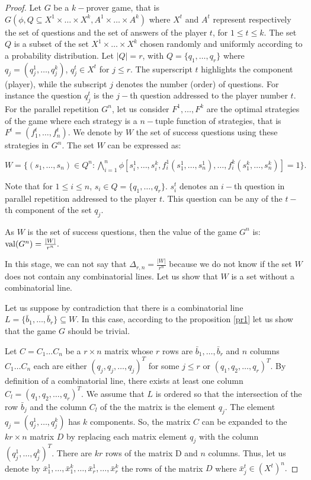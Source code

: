 \begin{proof}
Let $G$ be a $k-$prover game, that is $G(\phi, Q\subseteq X^1 \times \ldots \times X^k, A^1 \times \ldots \times A^k)$ where $X^t$ and $A^t$ represent respectively the set of questions and the set of answers of the player $t$, for $1\leq t \leq k.$ The set $Q$ is a subset of the set $X^1 \times \ldots \times X^k$ chosen randomly and uniformly according to a probability distribution. Let $|Q|=r$, with $Q=\{q_1, \ldots, q_r\}$ where $q_j=(q_j^1,\ldots, q_j^k)$, $q_j^t \in X^t$ for $j\leq r.$ The superscript  $t$ highlights the component (player), while the subscript $j$ denotes the number (order) of questions. For instance the question $q_j^t$ is the $j-$th question addressed to the player number $t.$  For the parallel repetition $G^n$, let us consider $F^1, \ldots, F^k$ are the optimal strategies of the game where each strategy is a $n-$tuple function of strategies, that is $F^t=(f_1^t,\ldots, f_n^t)$. We denote by $W$ the set of success questions using these strategies in $G^n.$ The set $W$ can be expressed as: 
 
$W=\{(s_1, \ldots, s_n) \in Q^n: \bigwedge\limits_{i=1}^n \phi \left[ s_i^1, \ldots, s_i^k, f_i^1(s_1^1, \ldots, s_n^1), \ldots, f_i^k(s_1^k, \ldots, s_n^k) \right]=1 \}.$

Note that for $1\leq i \leq n$,  $s_i \in Q=\{q_1, \ldots, q_r\}.$ $s_i^t$ denotes an $i-$th question in parallel repetition addressed to the player $t$. This question can be any of the $t-$th component of the set  $q_j.$
 
As $W$ is the set of success questions, then the value of the game $G^n$ is: $\mathrm{val} (G^n) = \frac{|W|}{r^n}.$
 
In this stage, we can not say that $\Delta_{r,n}=\frac{|W|}{r^n}$ because we do not know if the set  $W$ does not contain any combinatorial lines. Let us show that $W$ is a set without a combinatorial line.

Let us suppose by contradiction that there is a combinatorial line $L=\{\bar{b}_1, \ldots, \bar{b}_r \} \subseteq W.$ In this case, according to the proposition \eqref{pr1} let us show that the game  $G$ should be trivial.
 
Let $C=C_1\ldots C_n$ be a $r \times n$ matrix whose $r$ rows are $\bar{b}_1, \ldots, \bar{b}_r$ and $n$ columns $C_1\ldots C_n$ each are either $(q_j,q_j,\ldots,q_j)^T$ for some $j\leq r$ or $(q_1,q_2,\ldots,q_r)^T.$ By definition of a combinatorial line, there exists at least one column $C_l=(q_1,q_2,\ldots,q_r)^T.$ We assume that $L$ is ordered so that the intersection of the row $\bar{b}_j$ and the column $C_l$ of the the matrix is the element $q_j.$ The element $q_j=(q_j^1,\ldots, q_j^k)$ has $k$ components. So, the  matrix $C$ can be expanded to the $kr \times n$ matrix $D$ by replacing each matrix element $q_j$ with the column $(q_j^1,\ldots, q_j^k)^T.$ There are $kr$ rows of the matrix D and $n$ columns. Thus, let us denote by $\bar{x}_1^1, \ldots, \bar{x}_1^k, \ldots, \bar{x}_r^1, \ldots, \bar{x}_r^k$ the rows of the matrix $D$ where $\bar{x}_j^t \in  (X^t)^n.$


\end{proof}
